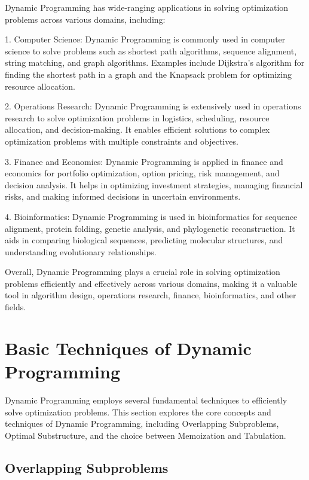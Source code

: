 \documentclass[12pt]{book} %
\begin{document}
Dynamic Programming has wide-ranging applications in solving optimization problems across various domains, including:

1. Computer Science: Dynamic Programming is commonly used in computer science to solve problems such as shortest path algorithms, sequence alignment, string matching, and graph algorithms. Examples include Dijkstra's algorithm for finding the shortest path in a graph and the Knapsack problem for optimizing resource allocation.

2. Operations Research: Dynamic Programming is extensively used in operations research to solve optimization problems in logistics, scheduling, resource allocation, and decision-making. It enables efficient solutions to complex optimization problems with multiple constraints and objectives.

3. Finance and Economics: Dynamic Programming is applied in finance and economics for portfolio optimization, option pricing, risk management, and decision analysis. It helps in optimizing investment strategies, managing financial risks, and making informed decisions in uncertain environments.

4. Bioinformatics: Dynamic Programming is used in bioinformatics for sequence alignment, protein folding, genetic analysis, and phylogenetic reconstruction. It aids in comparing biological sequences, predicting molecular structures, and understanding evolutionary relationships.

Overall, Dynamic Programming plays a crucial role in solving optimization problems efficiently and effectively across various domains, making it a valuable tool in algorithm design, operations research, finance, bioinformatics, and other fields.

\section{Basic Techniques of Dynamic Programming}

Dynamic Programming employs several fundamental techniques to efficiently solve optimization problems. This section explores the core concepts and techniques of Dynamic Programming, including Overlapping Subproblems, Optimal Substructure, and the choice between Memoization and Tabulation.

\subsection{Overlapping Subproblems}
\end{document}
